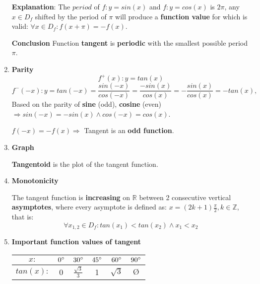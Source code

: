\documentclass{article}
\begin{document}
\begin{enumerate}
    \textbf{Explanation}: The $period$ of $f:y=sin(x)$ and $f:y=cos(x)$ is $2\pi$, any $x \in D_f$ shifted by the period of $\pi$ will produce a \textbf{function value} for which is valid: $\forall x \in D_f: f(x + \pi)=-f(x)$.
    
    \textbf{Conclusion}
    Function \textbf{tangent} is \textbf{periodic} with the smallest possible period $\pi$.
    
    \item \textbf{Parity}
    \[
    f^+(x):y=tan(x)
    \]
    \[
    f^-(-x):y=tan(-x) = \frac{sin(-x)}{cos(-x)} = \frac{-sin(x)}{cos(x)} = -\frac{sin(x)}{cos(x)} = -tan(x),
    \]
    Based on the parity of \textbf{sine} (odd), \textbf{cosine} (even) $\Rightarrow sin(-x)=-sin(x) \land cos(-x) = cos(x)$.
    
    $f(-x) = -f(x) \Rightarrow$ Tangent is an \textbf{odd function}.
    
    \item \textbf{Graph}
    
    \textbf{Tangentoid} is the plot of the tangent function.
    
    \item \textbf{Monotonicity}
    
    The tangent function is \textbf{increasing} on $\mathbb{R}$ between 2 consecutive vertical \textbf{asymptotes}, where every asymptote is defined as: $x=(2k + 1)\frac{\pi}{2}, k \in\mathbb{Z}$,\\that is:
    \[
    \forall x_{1,2}\in D_f:tan(x_1)<tan(x_2) \land x_1<x_2 
    \]
    
    \item \textbf{Important function values of tangent}
    
    \begin{center}
    \begin{tabular}{||c c c c c c||} 
    \hline
     $x: $ & $0\degree$ & $30\degree$ & $45\degree$ & $60\degree$ & $90\degree$ \\ [0.5ex] 
     \hline
     $tan(x): $ & 0 & $\frac{\sqrt{3}}{3}$ & 1 & $\sqrt{3}$ & $\text{\O}$ \\ [1ex] 
     \hline
    \end{tabular}   
    \end{center}
    
\end{enumerate}
\end{document}
